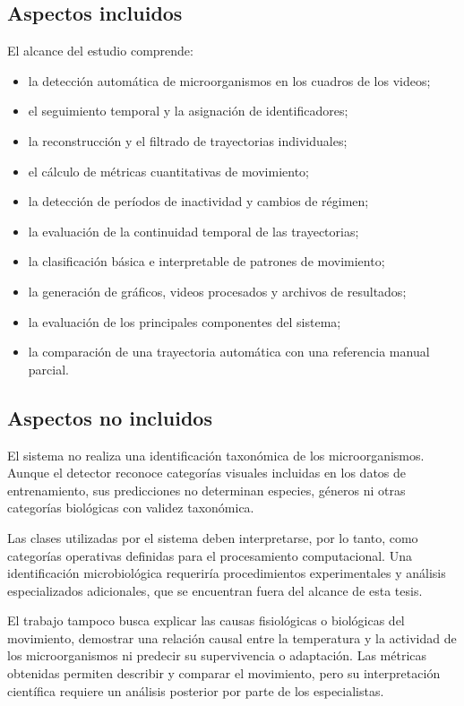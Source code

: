 \subsection{Aspectos incluidos}

El alcance del estudio comprende:

\begin{itemize}
  \item la detección automática de microorganismos en los cuadros de los videos;
  \item el seguimiento temporal y la asignación de identificadores;
  \item la reconstrucción y el filtrado de trayectorias individuales;
  \item el cálculo de métricas cuantitativas de movimiento;
  \item la detección de períodos de inactividad y cambios de régimen;
  \item la evaluación de la continuidad temporal de las trayectorias;
  \item la clasificación básica e interpretable de patrones de movimiento;
  \item la generación de gráficos, videos procesados y archivos de resultados;
  \item la evaluación de los principales componentes del sistema;
  \item la comparación de una trayectoria automática con una referencia manual parcial.
\end{itemize}

\subsection{Aspectos no incluidos}

El sistema no realiza una identificación taxonómica de los microorganismos. Aunque el detector reconoce categorías visuales incluidas en los datos de entrenamiento, sus predicciones no determinan especies, géneros ni otras categorías biológicas con validez taxonómica.

Las clases utilizadas por el sistema deben interpretarse, por lo tanto, como categorías operativas definidas para el procesamiento computacional. Una identificación microbiológica requeriría procedimientos experimentales y análisis especializados adicionales, que se encuentran fuera del alcance de esta tesis.

El trabajo tampoco busca explicar las causas fisiológicas o biológicas del movimiento, demostrar una relación causal entre la temperatura y la actividad de los microorganismos ni predecir su supervivencia o adaptación. Las métricas obtenidas permiten describir y comparar el movimiento, pero su interpretación científica requiere un análisis posterior por parte de los especialistas.

